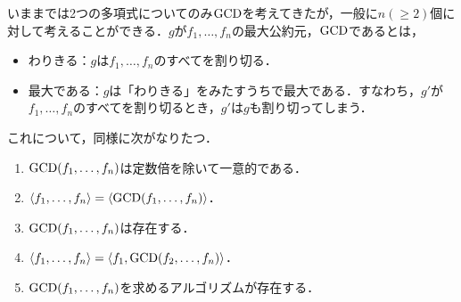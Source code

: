 \documentclass[9pt]{ltjsarticle}
\begin{document}
いままでは2つの多項式についてのみ${\rm GCD}$を考えてきたが，一般に$n(\ge 2)$個に対して考えることができる．$g$が$f_1,\dots,f_n$の最大公約元，${\rm GCD}$であるとは，
\begin{itemize}
 \item わりきる：$g$は$f_1,\dots,f_n$のすべてを割り切る．
 \item 最大である：$g$は「わりきる」をみたすうちで最大である．すなわち，$g'$が$f_1,\dots,f_n$のすべてを割り切るとき，$g'$は$g$も割り切ってしまう．
\end{itemize}

これについて，同様に次がなりたつ．
\begin{enumerate}[label=(\arabic*)]
 \item ${\rm GCD}(f_1,\dots,f_n)$は定数倍を除いて一意的である．
 \item $\left\langle f_1,\dots,f_n \right\rangle=\left\langle {\rm GCD}(f_1,\dots,f_n) \right\rangle$．
 \item ${\rm GCD}(f_1,\dots,f_n)$は存在する．
 \item $\left\langle f_1,\dots,f_n \right\rangle=\left\langle f_1,{\rm GCD}(f_2,\dots,f_n) \right\rangle$．
 \item ${\rm GCD}(f_1,\dots,f_n)$を求めるアルゴリズムが存在する．
\end{enumerate}
\end{document}
